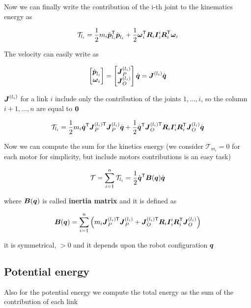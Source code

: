 Now we can finally write the contribution of the i-th joint to the kinematics energy as

\[
	\mathcal{T}_{l_i} =
	\frac{1}{2} m_i \dot{\boldsymbol{p}}_{l_i}^{\mathsf{T}} \dot{\boldsymbol{p}}_{l_i} +
	\frac{1}{2} \boldsymbol{\omega}_i^{\mathsf{T}} \boldsymbol{R}_i \boldsymbol{I}_i^i \boldsymbol{R}_i^{\mathsf{T}} \boldsymbol{\omega}_i
\]

The velocity can easily write as

\[
	\begin{bmatrix}
		\dot{\boldsymbol{p}}_{l_i} \\
		\boldsymbol{\omega}_i
	\end{bmatrix} =
	\begin{bmatrix}
		\boldsymbol{J}_P^{(l_i)} \\
		\boldsymbol{J}_O^{(l_i)}
	\end{bmatrix} \dot{\boldsymbol{q}} =
	\boldsymbol{J}^{(l_i)} \dot{\boldsymbol{q}}
\]

\begin{nb}$\boldsymbol{J}^{(l_i)}$ for a link $i$ include only the contribution of the joints $1, \dots, i$, so the column $i+1,\dots,n$ are equal to $\boldsymbol{0}$\end{nb}

\[
	\mathcal{T}_{l_i} =
	\frac{1}{2} m_i \dot{\boldsymbol{q}}^{\mathsf{T}} \boldsymbol{J}_P^{(l_i)\mathsf{T}} \boldsymbol{J}_P^{(l_i)} \dot{\boldsymbol{q}} +
	\frac{1}{2} \dot{\boldsymbol{q}}^{\mathsf{T}} \boldsymbol{J}_O^{(l_i)\mathsf{T}} \boldsymbol{R}_i \boldsymbol{I}_i^i \boldsymbol{R}_i^{\mathsf{T}} \boldsymbol{J}_O^{(l_i)} \dot{\boldsymbol{q}}
\]

Now we can compute the sum for the kinetics energy (we consider $\mathcal{T}_{m_i} = 0$ for each motor for simplicity, but include motors contributions is an easy task)

\[
	\mathcal{T} =
	\sum_{i=1}^n \mathcal{T}_{l_i} =
	\frac{1}{2} \dot{\boldsymbol{q}}^{\mathsf{T}} \boldsymbol{B}(\boldsymbol{q}) \dot{\boldsymbol{q}}
\]

where $\boldsymbol{B}(\boldsymbol{q})$ is called \textbf{inertia matrix} and it is defined as

\[
	\boldsymbol{B}(\boldsymbol{q}) = \sum_{i=1}^n \left(
	m_i \boldsymbol{J}_P^{(l_i)\mathsf{T}} \boldsymbol{J}_P^{(l_i)} +
	\boldsymbol{J}_O^{(l_i)\mathsf{T}} \boldsymbol{R}_i \boldsymbol{I}_i^i \boldsymbol{R}_i^{\mathsf{T}} \boldsymbol{J}_O^{(l_i)}
	\right)
\]

it is symmetrical, $> 0$ and it depends upon the robot configuration $\boldsymbol{q}$

\subsection{Potential energy}

Also for the potential energy we compute the total energy as the sum of the contribution of each link

